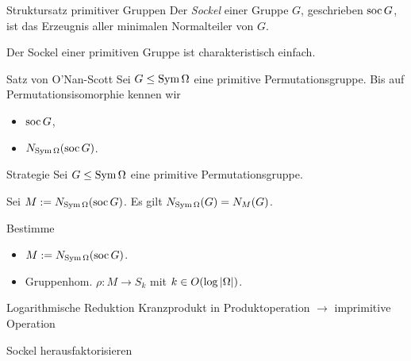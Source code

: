 \begin{frame}{Struktursatz primitiver Gruppen}
Der \emph{Sockel} einer Gruppe $G$, geschrieben
$\operatorname{soc} G$, ist das Erzeugnis aller minimalen Normalteiler von $G$.

\pause
Der Sockel einer primitiven Gruppe ist charakteristisch einfach.

\pause
\begin{block}{Satz von O'Nan-Scott}
Sei $G \leq \operatorname{Sym} \Omega$ eine primitive Permutationsgruppe.
Bis auf Permutationsisomorphie kennen wir
\begin{itemize}
\item $\operatorname{soc} G$,
\item $N_{\operatorname{Sym} \Omega}( \operatorname{soc} G )$.
\end{itemize}
\end{block}
\end{frame}


\begin{frame}{Strategie}
Sei $G \leq \operatorname{Sym} \Omega$ eine primitive Permutationsgruppe.

\pause
Sei $M := N_{\operatorname{Sym} \Omega}(\operatorname{soc} G)$.
Es gilt $N_{\operatorname{Sym} \Omega}(G) = N_M(G)$.

\pause
Bestimme
\begin{itemize}
\item $M := N_{\operatorname{Sym} \Omega}(\operatorname{soc} G)$.
\pause
\item Gruppenhom.
$
    \rho : M \to S_k
$
mit $k \in O(\log  \left| \Omega \right| )$.
\end{itemize}
\end{frame}


\begin{frame}{Logarithmische Reduktion}
Kranzprodukt in Produktoperation
$\rightarrow$
imprimitive Operation

\pause
Sockel herausfaktorisieren
\end{frame}

